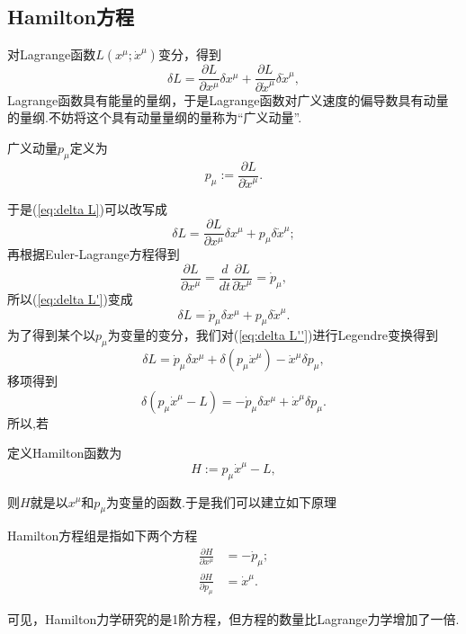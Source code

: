 	\subsection{Hamilton方程}
		对Lagrange函数$L(x^\mu;{\dot{x}}^\mu)$变分，得到
		\begin{equation}\label{eq:delta L}
		\delta L=\frac{\partial L}{\partial x^\mu}\delta x^\mu+\frac{\partial L}{\partial {\dot{x}}^\mu}\delta {\dot{x}}^\mu,
		\end{equation}
		Lagrange函数具有能量的量纲，于是Lagrange函数对广义速度的偏导数具有动量的量纲.不妨将这个具有动量量纲的量称为“广义动量”.
		\begin{definition}
		广义动量$p_\mu$定义为
		\begin{equation}
			p_\mu:=\frac{\partial L}{\partial {\dot{x}}^\mu}.
		\end{equation}
		\end{definition}
		于是(\ref{eq:delta L})可以改写成
		\begin{equation}\label{eq:delta L'}
		\delta L=\frac{\partial L}{\partial x^\mu}\delta x^\mu+p_\mu\delta {\dot{x}}^\mu;
		\end{equation}
		再根据Euler-Lagrange方程得到
		\begin{equation*}
		\frac{\partial L}{\partial x^\mu}=\frac{d}{dt}\frac{\partial L}{\partial {\dot{x}}^\mu}={\dot{p}}_\mu,
		\end{equation*}
		所以(\ref{eq:delta L'})变成
		\begin{equation}\label{eq:delta L''}
		\delta L={\dot{p}}_\mu\delta x^\mu+p_\mu\delta {\dot{x}}^\mu.
		\end{equation}
		为了得到某个以$p_\mu$为变量的变分，我们对(\ref{eq:delta L''})进行Legendre变换得到
		\begin{equation*}
		\delta L={\dot{p}}_\mu\delta x^\mu+\delta(p_\mu{\dot{x}}^\mu)-{\dot{x}}^\mu\delta p_\mu,
		\end{equation*}
		移项得到
		\begin{equation}\label{eq:delta H}
		\delta(p_\mu{\dot{x}}^\mu-L)=-{\dot{p}}_\mu\delta x^\mu+{\dot{x}}^\mu\delta p_\mu.
		\end{equation}
		所以,若
		\begin{definition}
		定义Hamilton函数为
		\begin{equation}
			H:=p_\mu{\dot{x}}^\mu-L,
		\end{equation}
		\end{definition}
		则$H$就是以$x^\mu$和$p_\mu$为变量的函数.于是我们可以建立如下原理
		\begin{theorem}
		Hamilton方程组是指如下两个方程
		\begin{equation}
			\begin{split}\label{eq:H}
				\frac{\partial H}{\partial x^\mu}&=-{\dot{p}}_\mu;\\
				\frac{\partial H}{\partial p_\mu}&={\dot{x}}^\mu.
			\end{split}
		\end{equation}
		\end{theorem}
		可见，Hamilton力学研究的是1阶方程，但方程的数量比Lagrange力学增加了一倍.
	
